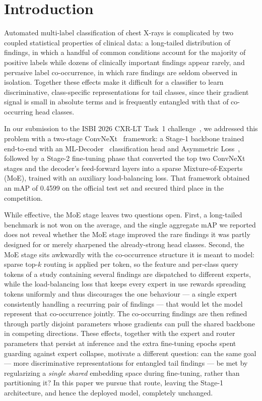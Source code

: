 \documentclass[conference]{IEEEtran}
\begin{document}
\section{Introduction}
Automated multi-label classification of chest X-rays is complicated by two coupled statistical properties of clinical data: a long-tailed distribution of findings, in which a handful of common conditions account for the majority of positive labels while dozens of clinically important findings appear rarely, and pervasive label co-occurrence, in which rare findings are seldom observed in isolation. Together these effects make it difficult for a classifier to learn discriminative, class-specific representations for tail classes, since their gradient signal is small in absolute terms and is frequently entangled with that of co-occurring head classes.

In our submission to the ISBI 2026 CXR-LT Task~1 challenge~\cite{b12}, we addressed this problem with a two-stage ConvNeXt~\cite{b1} framework: a Stage-1 backbone trained end-to-end with an ML-Decoder~\cite{b2} classification head and Asymmetric Loss~\cite{b3}, followed by a Stage-2 fine-tuning phase that converted the top two ConvNeXt stages and the decoder's feed-forward layers into a sparse Mixture-of-Experts (MoE), trained with an auxiliary load-balancing loss. That framework obtained an mAP of 0.4599 on the official test set and secured third place in the competition.

While effective, the MoE stage leaves two questions open. First, a long-tailed benchmark is not won on the average, and the single aggregate mAP we reported does not reveal whether the MoE stage improved the rare findings it was partly designed for or merely sharpened the already-strong head classes. Second, the MoE stage sits awkwardly with the co-occurrence structure it is meant to model: sparse top-$k$ routing is applied per token, so the feature and per-class query tokens of a study containing several findings are dispatched to different experts, while the load-balancing loss that keeps every expert in use rewards spreading tokens uniformly and thus discourages the one behaviour --- a single expert consistently handling a recurring pair of findings --- that would let the model represent that co-occurrence jointly. The co-occurring findings are then refined through partly disjoint parameters whose gradients can pull the shared backbone in competing directions. These effects, together with the expert and router parameters that persist at inference and the extra fine-tuning epochs spent guarding against expert collapse, motivate a different question: can the same goal --- more discriminative representations for entangled tail findings --- be met by regularizing a \emph{single shared} embedding space during fine-tuning, rather than partitioning it? In this paper we pursue that route, leaving the Stage-1 architecture, and hence the deployed model, completely unchanged.
\end{document}
